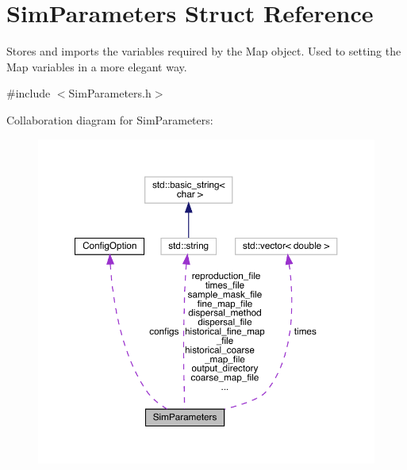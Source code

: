\hypertarget{struct_sim_parameters}{}\section{Sim\+Parameters Struct Reference}
\label{struct_sim_parameters}


Stores and imports the variables required by the Map object. Used to setting the Map variables in a more elegant way.  




{\ttfamily \#include $<$Sim\+Parameters.\+h$>$}



Collaboration diagram for Sim\+Parameters\+:
\nopagebreak
\begin{figure}[H]
\begin{center}
\leavevmode
\includegraphics[width=350pt]{struct_sim_parameters__coll__graph}
\end{center}
\end{figure}
